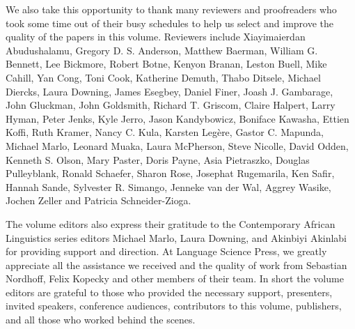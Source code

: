 \begin{refsection}
\begin{sloppypar}
We also take this opportunity to thank many reviewers and proofreaders who took some time out of their busy schedules to help us select and improve the quality of the papers in this volume. Reviewers include Xiayimaierdan Abudushalamu, Gregory D. S. Anderson, Matthew Baerman, William G. Bennett, Lee Bickmore, Robert Botne, Kenyon Branan, Leston Buell, Mike Cahill, Yan Cong, Toni Cook, Katherine Demuth, Thabo Ditsele, Michael Diercks, Laura Downing, James Esegbey, Daniel Finer, Joash J. Gambarage, John Gluckman, John Goldsmith, Richard T. Griscom, Claire Halpert, Larry Hyman, Peter Jenks, Kyle Jerro, Jason Kandybowicz, Boniface Kawasha, Ettien Koffi, Ruth Kramer, Nancy C. Kula, Karsten Legère, Gastor C. Mapunda, Michael Marlo, Leonard Muaka, Laura McPherson, Steve Nicolle, David Odden, Kenneth S. Olson, Mary Paster, Doris Payne, Asia Pietraszko, Douglas Pulleyblank, Ronald Schaefer, Sharon Rose, Josephat Rugemarila, Ken Safir, Hannah Sande, Sylvester R. Simango, Jenneke van der Wal, Aggrey Wasike, Jochen Zeller and Patricia Schneider-Zioga.
\end{sloppypar}

The volume editors also express their gratitude to the Contemporary African Linguistics series editors Michael Marlo, Laura Downing, and Akinbiyi Akinlabi for providing support and direction. At Language Science Press, we greatly appreciate all the assistance we received and the quality of work from Sebastian Nordhoff, Felix Kopecky and other members of their team. In short the volume editors are grateful to those who provided the necessary support, presenters, invited speakers, conference audiences, contributors to this volume, publishers, and all those who worked behind the scenes.

\end{refsection}
